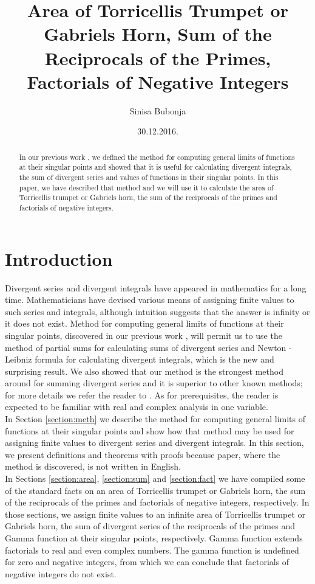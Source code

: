 \documentclass[12pt]{article}
\title{Area of Torricelli\textsc{\char13}s Trumpet or Gabriel\textsc{\char13}s Horn, Sum of the Reciprocals of the Primes, Factorials of Negative Integers}
\author{Sinisa Bubonja}
\date{30.12.2016.}
\begin{document}
\maketitle
\begin{abstract}
In our previous work \cite{bub}, we defined the method for computing general limits of functions at their singular points and showed that it is useful for calculating divergent integrals, the sum of divergent series and values of functions in their singular points. In this paper, we have described that method and we will use it to calculate the area of Torricelli\textsc{}s trumpet or Gabriel\textsc{}s horn, the sum of the reciprocals of the primes and factorials of negative integers.
\end{abstract}

\tableofcontents  
  
\section{Introduction}
\label{section:intro}

Divergent series and divergent integrals have appeared in mathematics for a long time. Mathematicians have devised various means of assigning finite values to such series and integrals, although intuition suggests that the answer is infinity or it does not exist. Method for computing general limits of functions at their singular points, discovered in our previous work \cite{bub}, will permit us to use the method of partial sums for calculating sums of divergent series and Newton - Leibniz formula for calculating divergent integrals, which is the new and surprising result. We also showed that our method is the strongest method around for summing divergent series and it is superior to other known methods; for more details we refer the reader to \cite{mat}. As for prerequisites, the reader is expected to be familiar with real and complex analysis in one variable.\\

In Section \ref{section:meth} we describe the method for computing general limits of functions at their singular points and show how that method may be used for assigning finite values to divergent series and divergent integrals. In this section, we present definitions and theorems with proofs because paper, \cite{bub} where the method is discovered, is not written in English.\\

In Sections \ref{section:area}, \ref{section:sum} and \ref{section:fact} we have compiled some of the standard facts on an area of Torricelli\textsc{}s trumpet or Gabriel\textsc{}s horn, the sum of the reciprocals of the primes and factorials of negative integers, respectively. In those sections, we assign finite values to an infinite area of Torricelli\textsc{}s trumpet or Gabriel\textsc{}s horn, the sum of divergent series of the reciprocals of the primes and Gamma function at their singular points, respectively. Gamma function extends factorials to real and even complex numbers. The gamma function is undefined for zero and negative integers, from which we can conclude that factorials of negative integers do not exist.
\end{document}
